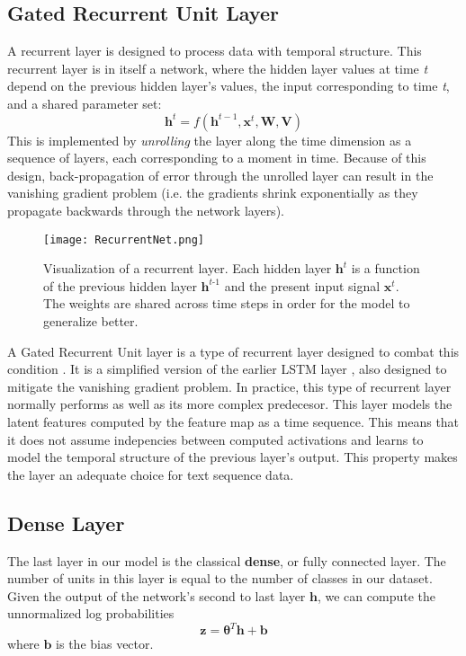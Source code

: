 \subsection{Gated Recurrent Unit Layer}
A recurrent layer is designed to process data with temporal structure\cite{rumelhart1986sequential}.
This recurrent layer is in itself a network, where the hidden layer values at time \textit{t} depend on the previous
hidden layer's values, the input corresponding to time \textit{t}, and a shared parameter set:
\[\bm{h}^{t} = f(\bm{h}^{t-1}, \bm{x}^{t}, \bm{W}, \bm{V})\]
This is implemented by \textit{unrolling} the layer along the time dimension as a sequence of layers, each corresponding
to a moment in time. Because of this design, back-propagation of error through the unrolled layer can result
in the vanishing gradient problem (i.e. the gradients shrink exponentially as they propagate backwards through the network layers).

\begin{figure}[H]
\centering
\texttt{[image: RecurrentNet.png]}
\caption{Visualization of a recurrent layer. Each hidden layer $\bm{h}^{\textit{t}}$ is a function of the previous hidden
layer $\bm{h}^{\textit{t-1}}$ and the present input signal $\bm{x}^{\textit{t}}$. The weights are shared across time steps
in order for the model to generalize better.}
\end{figure}

A Gated Recurrent Unit layer is a type of recurrent layer designed to combat this condition \cite{chung2014empirical}.
It is a simplified version of the earlier LSTM layer \cite{hochreiter1997long}, also designed to mitigate the vanishing gradient problem.
In practice, this type of recurrent layer normally performs as well as its more complex predecesor.
This layer models the latent features computed by the feature map as a time sequence. This means that it
does not assume indepencies between computed activations and learns to model the temporal structure of the previous
layer's output. This property makes the layer an adequate choice for text sequence data.

\subsection{Dense Layer}
The last layer in our model is the classical \textbf{dense}, or fully connected layer.
The number of units in this layer is equal to the number of classes in our dataset.
Given the output of the network's second to last layer $\bm{h}$, we can compute the unnormalized log probabilities
\[\bm{z} = \bm{\theta}^{T}\bm{h} + \bm{b}\]
where $\bm{b}$ is the bias vector.




